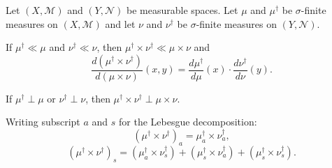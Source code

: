 Let $(X, \mathcal{M})$ and $(Y, \mathcal{N})$ be measurable spaces. Let $\mu$ and $\mu^\dagger$ be $\sigma$-finite measures on $(X, \mathcal{M})$ and let $\nu$ and $\nu^\dagger$ be $\sigma$-finite measures on $(Y, \mathcal{N})$.

If $\mu^\dagger \ll \mu$ and $\nu^\dagger \ll \nu$, then $\mu^\dagger \times \nu^\dagger \ll \mu \times \nu$ and
$$\frac{d(\mu^\dagger \times \nu^\dagger)}{d(\mu \times \nu)}(x, y) = \frac{d\mu^\dagger}{d\mu}(x) \cdot \frac{d\nu^\dagger}{d\nu}(y).$$

If $\mu^\dagger \perp \mu$ or $\nu^\dagger \perp \nu$, then $\mu^\dagger \times \nu^\dagger \perp \mu \times \nu$.

Writing subscript $a$ and $s$ for the Lebesgue decomposition:
$$(\mu^\dagger \times \nu^\dagger)_a = \mu_a^\dagger \times \nu_a^\dagger,$$
$$(\mu^\dagger \times \nu^\dagger)_s = (\mu_a^\dagger \times \nu_s^\dagger) + (\mu_s^\dagger \times \nu_a^\dagger) + (\mu_s^\dagger \times \nu_s^\dagger).$$
